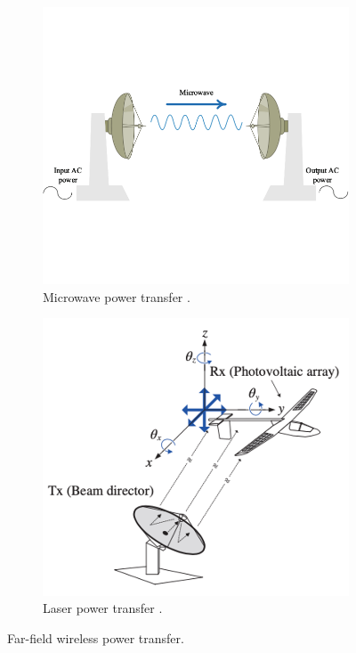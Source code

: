 \begin{figure}[htbp]
    \begin{subfigure}{0.5\textwidth}
        \centering
        \includegraphics[width=0.9\linewidth]{images/1_microwave_power_transfer.png}
        \caption{Microwave power transfer \cite{Orekan}.}
        \label{fig:subim1}
    \end{subfigure}
    \begin{subfigure}{0.5\textwidth}
        \centering
        \includegraphics[width=0.9\linewidth]{images/1_laser_power_transfer.png}
        \caption{Laser power transfer \cite{Chun}.}
        \label{fig:subim2}
    \end{subfigure}

    \caption{Far-field wireless power transfer.}
    \label{fig:far-fieldwpt}
\end{figure}

